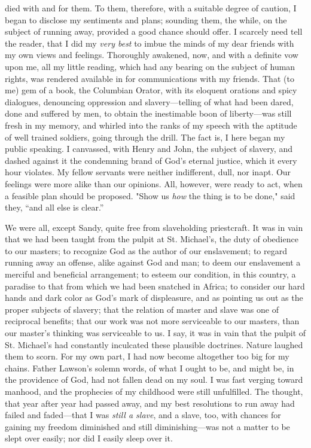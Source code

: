died with and for them. To them, therefore, with a suitable degree of
caution, I began to disclose my sentiments and plans; sounding them, the
while, on the subject of running away, provided a good chance should
offer. I scarcely need tell the reader, that I did my \emph{very best}
to imbue the minds of my dear friends with my own views and feelings.
Thoroughly awakened, now, and with a definite vow upon me, all my little
reading, which had any bearing on the subject of human rights, was
rendered {\protect\hypertarget{275}{}{}}available in for communications
with my friends. That (to me) gem of a book, the Columbian Orator, with
its eloquent orations and spicy dialogues, denouncing oppression and
slavery---telling of what had been dared, done and suffered by men, to
obtain the inestimable boon of liberty---was still fresh in my memory,
and whirled into the ranks of my speech with the aptitude of well
trained soldiers, going through the drill. The fact is, I here began my
public speaking. I canvassed, with Henry and John, the subject of
slavery, and dashed against it the condemning brand of God's eternal
justice, which it every hour violates. My fellow servants were neither
indifferent, dull, nor inapt. Our feelings were more alike than our
opinions. All, however, were ready to act, when a feasible plan should
be proposed. "Show us \emph{how} the thing is to be done," said they,
``and all else is clear.''

We were all, except Sandy, quite free from slaveholding priestcraft. It
was in vain that we had been taught from the pulpit at St. Michael's,
the duty of obedience to our masters; to recognize God as the author of
our enslavement; to regard running away an offense, alike against God
and man; to deem our enslavement a merciful and beneficial arrangement;
to esteem our condition, in this country, a paradise to that from which
we had been snatched in Africa; to consider our hard hands and dark
color as God's mark of displeasure, and as pointing us out as the proper
subjects of slavery; that the relation of master and slave was one of
reciprocal benefits; that our work was not more serviceable to our
masters, than our master's thinking was serviceable to us. I
{\protect\hypertarget{276}{}{}}say, it was in vain that the pulpit of
St. Michael's had constantly inculcated these plausible doctrines.
Nature laughed them to scorn. For my own part, I had now become
altogether too big for my chains. Father Lawson's solemn words, of what
I ought to be, and might be, in the providence of God, had not fallen
dead on my soul. I was fast verging toward manhood, and the prophecies
of my childhood were still unfulfilled. The thought, that year after
year had passed away, and my best resolutions to run away had failed and
faded---that I was \emph{still a slave}, and a slave, too, with chances
for gaining my freedom diminished and still diminishing---was not a
matter to be slept over easily; nor did I easily sleep over it.

